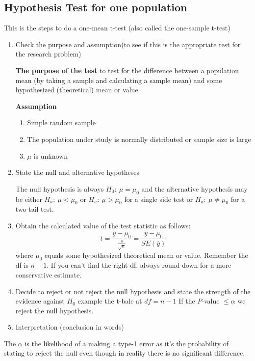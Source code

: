 \documentclass[../STAT-252-Notes.tex]{subfiles}
\begin{document}
\subsection{Hypothesis Test for one population}
This is the steps to do a one-mean t-test (also called the one-sample t-test)
\begin{enumerate}
  \item Check the purpose and assumption(to see if this is the appropriate test for the research problem)
    
    \textbf{The purpose of the test} to test for the difference between a population mean (by taking a sample and calculating a sample mean) and some hypothesized (theoretical) mean or value
    
    \textbf{Assumption}
    \begin{enumerate}
      \item Simple random sample
      \item The population under study is normally distributed or sample size is large
      \item $\mu$ is unknown
    \end{enumerate}
    \item State the null and alternative hypotheses

      The null hypothesis is always $H_0:\ \mu=\mu_0$ and the alternative hypothesis may be either $H_a : \ \mu < \mu_0$ or  $H_a : \ \mu > \mu_0$ for a single side test or  $H_a : \ \mu \ne \mu_0$ for a two-tail test.
    \item Obtain the calculated value of the test statistic as follows:
      \[ 
        t = \frac{\overline{y}-\mu_0}{\frac{s}{\sqrt{n} }} = \frac{\overline{y}-\mu_0}{SE(\overline{y})} 
      \] 
      where $\mu_0$ equals some hypothesized theoretical mean or value. Remember the df is $n-1$. If you can't find the right df, always round down for a more conservative estimate.
      \item Decide to reject or not reject the null hypothesis and state the strength of the evidence against $H_0$ example the t-bale at $df = n-1$ If the $P$-value $\le\alpha$ we reject the null hypothesis.
      \item Interpretation (conclusion in words)
\end{enumerate}
\begin{Note}
  The $\alpha$ is the likelihood of a making a type-1 error as it's the probability of stating to reject the null even though in reality there is no significant difference.
\end{Note}
\end{document}
